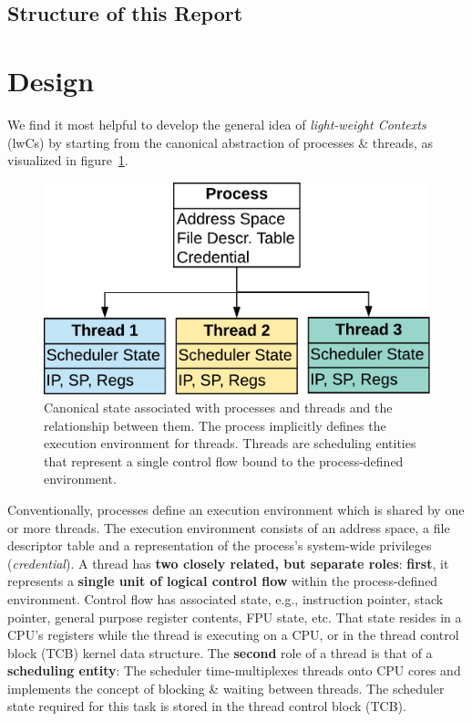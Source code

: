 \documentclass[10pt,twocolumn,letter]{article}
\begin{document}
\subsection{Structure of this Report}
\blindtext


\section{Design}\label{design}
We find it most helpful to develop the general idea of \textit{light-weight Contexts} (lwCs) by starting from the canonical abstraction of processes \& threads, as visualized in figure~\ref{design:fig:canonicalprocthreads}.
\begin{figure}
  \label{design:fig:canonicalprocthreads}
  \includegraphics[width=\linewidth]{fig/canonical-proc-thread-relationship}
  \caption{
    Canonical state associated with processes and threads and the relationship between them.
    The process implicitly defines the execution environment for threads.
    Threads are scheduling entities that represent a single control flow bound to the process-defined environment.
  }
\end{figure}
Conventionally, processes define an execution environment which is shared by one or more threads.
The execution environment consists of an address space, a file descriptor table and a representation of the process's system-wide privileges (\textit{credential}).
A thread has \textbf{two closely related, but separate roles}:
\textbf{first}, it represents a \textbf{single unit of logical control flow} within the process-defined environment.
Control flow has associated state, e.g., instruction pointer, stack pointer, general purpose register contents, FPU state, etc.
That state resides in a CPU's registers while the thread is executing on a CPU, or in the thread control block (TCB) kernel data structure.
The \textbf{second} role of a thread is that of a \textbf{scheduling entity}:
The scheduler time-multiplexes threads onto CPU cores and implements the concept of blocking \& waiting between threads.
The scheduler state required for this task is stored in the thread control block (TCB).
\end{document}
